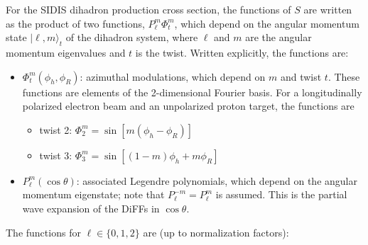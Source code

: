 \documentclass[12pt]{article}
\begin{document}
For the SIDIS dihadron production cross section,
the functions of $S$ are written as the product of two functions, 
$P_{\ell}^m\Phi_t^m$, which depend
on the angular momentum state $|\ell,m\rangle_t$ of the dihadron system, where
$\ell$ and $m$ are the angular momentum eigenvalues and $t$ is the twist.
Written explicitly, the functions are:
\begin{itemize}
\item $\Phi_t^m\left(\phi_h,\phi_R\right)$: 
azimuthal modulations, which depend on $m$ and twist $t$. These functions are
elements of the 2-dimensional Fourier basis. For a longitudinally polarized electron beam 
and an unpolarized proton target, the functions are
  \begin{itemize}
  \item twist 2: $\Phi_2^m=\sin\left[m\left(\phi_h-\phi_R\right)\right]$
  \item twist 3: $\Phi_3^m=\sin\left[\left(1-m\right)\phi_h+m\phi_R\right]$
  \end{itemize}
\item $P_{\ell}^{m}\left(\cos\theta\right)$:
associated Legendre polynomials, which depend on the angular momentum
eigenstate; note that $P_{\ell}^{-m}=P_{\ell}^{m}$ is assumed. This is the
partial wave expansion of the DiFFs in $\cos\theta$.
\end{itemize}
The functions for $\ell\in\{0,1,2\}$ are (up to normalization factors):
\end{document}
